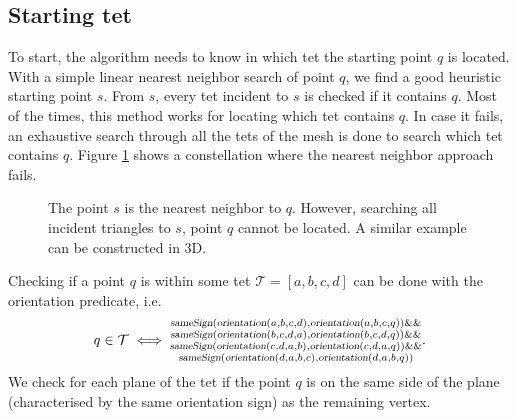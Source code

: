 \documentclass[../thesis.tex]{subfiles}
\begin{document}
\subsection{Starting tet}\label{subsec:starttet}
To start, the algorithm needs to know in which tet the starting point $q$ is located.
With a simple linear nearest neighbor search of point $q$, we find a good heuristic starting point
$s$. From $s$, every tet incident to $s$ is checked if it contains $q$.
Most of the times, this
method works for locating which tet contains $q$. In case it fails,
an exhaustive search through all the tets of the mesh is done to search
which tet contains $q$. Figure \ref{fig:fail} shows a constellation where the nearest
neighbor approach fails.
\begin{figure}[htb]
  \centering
  \def\svgwidth{10em}
  
  \caption{The point $s$ is the nearest neighbor to $q$. However, searching all incident triangles to $s$, point $q$ cannot be located.
  A similar example can be constructed in 3D.
  }\label{fig:fail}
\end{figure}
Checking if a point $q$ is within some tet $\mathcal{T}= [a,b,c,d]$ can be done with the orientation predicate, i.e.
$$q \in \mathcal{T} \iff \substack{
  \textsl{sameSign}(\textsl{orientation}(a,b,c,d), \textsl{orientation}(a,b,c,q)) \&\& \\
  \textsl{sameSign}(\textsl{orientation}(b,c,d,a), \textsl{orientation}(b,c,d,q)) \&\& \\
  \textsl{sameSign}(\textsl{orientation}(c,d,a,b), \textsl{orientation}(c,d,a,q)) \&\& \\
  \textsl{sameSign}(\textsl{orientation}(d,a,b,c), \textsl{orientation}(d,a,b,q))
}.$$
We check for each plane of the tet if the point $q$ is on the same side of the plane
(characterised by the same orientation sign) as the remaining vertex.
\end{document}
